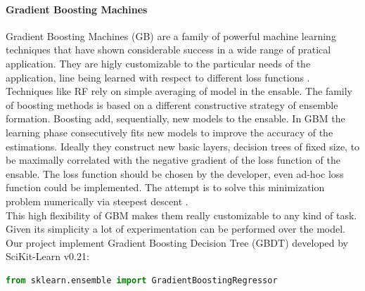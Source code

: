 \documentclass[%
    corpo=12pt,
    twoside,
    oldstyle,
    autoretitolo,
    greek,
    evenboxes,
]{toptesi}
\begin{document}
\paragraph{Gradient Boosting Machines}
Gradient Boosting Machines (GB) are a family of powerful machine learning techniques that have shown considerable success in a wide range of pratical application. They are higly customizable to the particular needs of the application, line being learned with respect to different loss functions \cite{gbm}. Techniques like RF rely on simple averaging of model in the ensable. The family of boosting methods is based on a different constructive strategy of ensemble formation. Boosting add, sequentially, new models to the ensable. In GBM the learning phase consecutively fits new models to improve the accuracy of the estimations. Ideally they construct new basic layers,  decision trees of fixed size, to be maximally correlated with the negative gradient of the loss function of the ensable. The loss function should be chosen by the developer, even ad-hoc loss function could be implemented. The attempt is to solve this minimization problem numerically via steepest descent \cite{ensable}.\\
This high flexibility of GBM makes them really customizable to any kind of task. Given its simplicity a lot of experimentation can be performed over the model.\\
Our project implement Gradient Boosting Decision Tree (GBDT) developed by SciKit-Learn v0.21:
\begin{lstlisting}[language=Python, frame=single]
  from sklearn.ensemble import GradientBoostingRegressor
\end{lstlisting}
\end{document}
